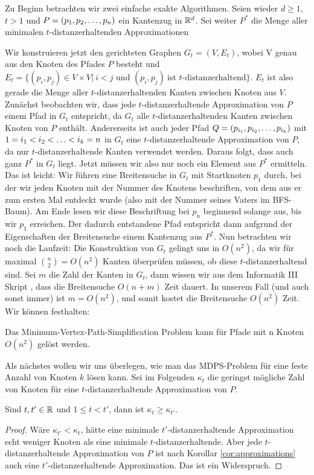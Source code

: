 	Zu Beginn betrachten wir zwei einfache exakte Algorithmen.
    Seien wieder $d\geq1$, $t>1$ und $P = (p_1, p_2, \mathellipsis, p_n)$ ein Kantenzug in $\mathbb{R}^d$. Sei weiter $P^*$ die Menge aller minimalen $t$-distanzerhaltenden Approximationen
    
    Wir konstruieren jetzt den gerichteten Graphen $G_t = (V,E_t)$, wobei V genau aus den Knoten des Pfades $P$ besteht und 
    $E_t = \{(p_i, p_j) \in V\times V|\ i < j \text{ und } (p_i,p_j)\ \text{ist $t$-distanzerhaltend}\}$. 
    $E_t$ ist also gerade die Menge aller $t$-distanzerhaltenden Kanten zwischen Knoten aus $V$. Zunächst beobachten wir, dass jede $t$-distanzerhaltende Approximation von $P$ einem Pfad in $G_t$ entspricht, da $G_t$ alle $t$-distanzerhaltenden Kanten zwischen Knoten von $P$ enthält. 
    Andererseits ist auch jeder Pfad $Q = (p_{i_1}, p_{i_2}, \mathellipsis, p_{i_k})$ mit $1 = i_1 < i_2 < \mathellipsis < i_k = n$ in $G_t$ eine $t$-distanzerhaltende Approximation von $P$, da nur $t$-distanzerhaltende Kanten verwendet werden. 
    Daraus folgt, dass auch ganz $P^*$ in $G_t$ liegt. Jetzt müssen wir also nur noch ein Element aus $P^*$ ermitteln. 
    Das ist leicht: Wir führen eine Breitensuche in $G_t$ mit Startknoten $p_1$ durch, bei der wir jeden Knoten mit der Nummer des Knotens beschriften, von dem aus er zum ersten Mal entdeckt wurde (also mit der Nummer seines Vaters im BFS-Baum). 
    Am Ende lesen wir diese Beschriftung bei $p_n$ beginnend solange aus, bis wir $p_1$ erreichen. Der dadurch entstandene Pfad entspricht dann aufgrund der Eigenschaften der Breitensuche einem Kantenzug aus $P^*$. 
    Nun betrachten wir noch die Laufzeit: Die Konstruktion von $G_t$ gelingt uns in $O(n^2)$, da wir für maximal $\binom{n}{2} = O(n^2)$ Kanten überprüfen müssen, ob diese $t$-distanzerhaltend sind. Sei $m$ die Zahl der Kanten in $G_t$, dann wissen wir aus dem Informatik III Skript \cite{hagerup}, dass die Breitensuche $O(n+m)$ Zeit dauert. In unserem Fall (und auch sonst immer) ist $m = O(n^2)$, und somit kostet die Breitensuche $O(n^2)$ Zeit. Wir können festhalten:
    \begin{theorem}
    	\label{theo:mvpsex}
    	Das Minimum-Vertex-Path-Simplification Problem kann für Pfade mit n Knoten $O(n^2)$ gelöst werden.
    \end{theorem} 
    
    Als nächstes wollen wir uns überlegen, wie man das MDPS-Problem für eine feste Anzahl von Knoten $k$ lösen kann. Sei im Folgenden $\kappa_t$ die geringst mögliche Zahl von Knoten für eine $t$-distanzerhaltende Approximation von $P$.
	\begin{lemma}
		\label{lem:kappa}
		Sind $t, t' \in \mathbb{R}$ und $1 \leq t < t'$, dann ist $\kappa_t \geq \kappa_{t'}$.
	\end{lemma}
	\begin{proof}
		Wäre $\kappa_{t'} < \kappa_t$, hätte eine minimale $t'$-distanzerhaltende Approximation echt weniger Knoten als eine minimale $t$-distanzerhaltende. Aber jede $t$-distanzerhaltende Approximation von $P$ ist nach Korollar \ref{cor:approximations} auch eine $t'$-distanzerhaltende Approximation. Das ist ein Widerspruch. 
	\end{proof}
	
